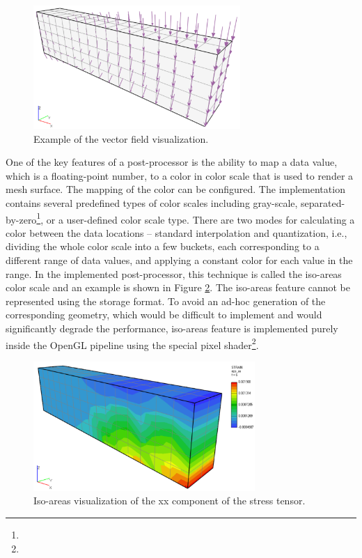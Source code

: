 \begin{figure}[H]
    \centering
    \includegraphics[width=0.7\textwidth]{figures/chapter-data-management/beam-vectors}
    \decoRule
    \caption{Example of the vector field visualization.}
    \label{fig:beam-vectors}
\end{figure}

One of the key features of a post-processor is the ability to map a data value, which is a floating-point number, to a color in color scale that is used to render a mesh surface. The mapping of the color can be configured. The implementation contains several predefined types of color scales including gray-scale, separated-by-zero\footnote{}, or a user-defined color scale type. There are two modes for calculating a color between the data locations -- standard interpolation and quantization, i.e., dividing the whole color scale into a few buckets, each corresponding to a different range of data values, and applying a constant color for each value in the range. In the implemented post-processor, this technique is called the iso-areas color scale and an example is shown in Figure \ref{fig:beam-isoareas-shader}. The iso-areas feature cannot be represented using the storage format. To avoid an ad-hoc generation of the corresponding geometry, which would be difficult to implement and would significantly degrade the performance, iso-areas feature is implemented purely inside the OpenGL pipeline using the special pixel shader\footnote{}.


\begin{figure}[H]
    \centering
    \includegraphics[width=0.75\textwidth]{figures/chapter-data-management/beam-isoareas-shader}
    \decoRule
    \caption{Iso-areas visualization of the xx component of the stress tensor.}
    \label{fig:beam-isoareas-shader}
\end{figure}


